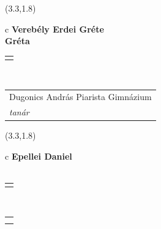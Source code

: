 \documentclass[11pt]{article}
\begin{document}
\makebox(3.3,1.8){
  \renewcommand\arraystretch{1.3}
  \begin{tabular}[c]{c}
    \hspace{8.5mm}
    \LARGE\bf{ Verebély Erdei Gréte }\\
    \hspace{8.5mm}
    \Large{ Gréta }\\
    \renewcommand\arraystretch{3}
    \begin{tabular}[c]{c}
      \centering
      \fontfamily{phv}\selectfont{
        \textbf{
          \textsc{
            \scriptsize{
            \color{Bright}{ Ismerkedő }\color{Bright}{ Webmester }\color{Bright}{ Sminkmester }\color{Dark}{ Programozó }
            }
          }
        }
      }
    \end{tabular}
    \\
    \renewcommand\arraystretch{1}
    \begin{tabular}{p{3.3in}}
      \hspace{.7cm}Dugonics András Piarista Gimnázium\\
      \hspace{.7cm}\emph{ tanár }\\
    \end{tabular}
  \end{tabular}
}

\makebox(3.3,1.8){
  \renewcommand\arraystretch{1.3}
  \begin{tabular}[c]{c}
    \hspace{8.5mm}
    \LARGE\bf{ Epellei Daniel }\\
    \hspace{8.5mm}
    \Large{  }\\
    \renewcommand\arraystretch{3}
    \begin{tabular}[c]{c}
      \centering
      \fontfamily{phv}\selectfont{
        \textbf{
          \textsc{
            \scriptsize{
            \color{Bright}{ Ismerkedő }\color{Bright}{ Webmester }\color{Bright}{ Sminkmester }\color{Bright}{ Programozó }
            }
          }
        }
      }
    \end{tabular}
    \\
    \renewcommand\arraystretch{1}
    \begin{tabular}{p{3.3in}}
      \hspace{.7cm}\\
      \hspace{.7cm}\emph{  }\\
    \end{tabular}
  \end{tabular}
}
\end{document}
